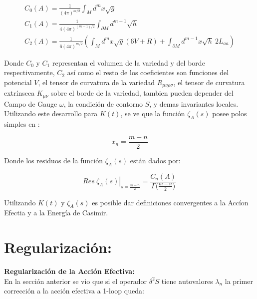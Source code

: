 \begin{equation}
\begin{array}{c}
C _0 (A) = \frac{1}{(4 \pi ) ^{m/2} }  \int  _{M} d ^m x \sqrt{g}  \\[10pt]
C _1 (A) = \frac{ 1 }{4 (4 \pi ) ^{(m-1)/2} } \int _{\partial M } d ^{m-1} \sqrt{h} \\[10pt]
C _2 (A) = \frac{ 1 }{6 (4 \pi) ^{m/2} } \left(
									\int _M d ^m x\sqrt{g} (6 V + R) +
									\int _{\partial M } d ^{m-1} x 
									\sqrt{h} \ 2 L _{aa} 
									\right)
\end{array}
\label{coef}
\end{equation} 

Donde $C _0$ y $C _1$ representan el volumen de la variedad y del borde respectivamente, $C _2$ así como el resto de los coeficientes son funciones del potencial $V$, el tensor de curvatura de la variedad $R _{\mu \nu \rho \sigma }$, el tensor de curvatura extrínseca $K _{\mu \nu }$ sobre el borde de la variedad, tambien pueden depender del Campo de Gauge $\omega $, la condición de contorno $S$, y demas invariantes locales.  \\


Utilizando este desarrollo para $K(t)$, se ve que la función $\zeta _A (s)$ posee polos simples en :


\begin{equation}
x _n = \frac{m-n}{2} 
\label{eq.ceros.zeta}
\end{equation}


Donde los residuos de la función $\zeta _A (s) $ están dados por:

\begin{equation}
\left. Res \ \zeta _A (s)  \right| _{s= \frac{m - n}{2}} =  
\frac{ C_n  (A) }{ {\Gamma ( \frac{m-n}{2}} ) }
\end{equation}


Utilizando $K(t)$ y $\zeta _A (s) $ es posible dar definiciones convergentes a la Accíon Efectia y a la Energía de Casimir.




\section{Regularización:}

\textbf{Regularización de la Acción Efectiva:} \\

En la sección anterior se vio que si el operador $\delta ^2 S$ tiene autovalores $\lambda _n$ la primer corrección a la acción efectiva a 1-loop queda:


